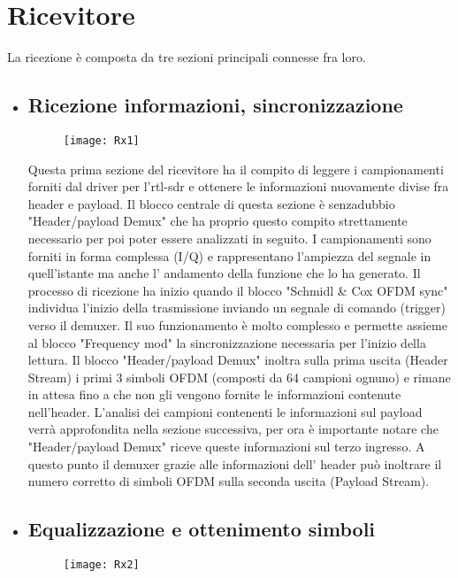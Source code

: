  \section{Ricevitore}
 La ricezione è composta da tre sezioni principali connesse fra loro.
 \begin{itemize}
 	\item \subsection{Ricezione informazioni, sincronizzazione}
 	\begin{figure}[h]
 		\centering
 		\texttt{[image: Rx1]}
 		\caption{}
 	\end{figure}
 Questa prima sezione del ricevitore ha il compito di leggere i campionamenti forniti dal driver per l'rtl-sdr e ottenere le informazioni nuovamente divise fra header e payload. Il blocco centrale di questa sezione è senzadubbio "Header/payload Demux" che ha proprio questo compito strettamente necessario per poi poter essere analizzati in seguito. I campionamenti sono forniti in forma complessa (I/Q) e rappresentano l'ampiezza del segnale in quell'istante ma anche l' andamento della funzione che lo ha generato. Il processo di ricezione ha inizio quando il blocco "Schmidl \& Cox OFDM sync" individua l'inizio della trasmissione inviando un segnale di comando (trigger) verso il demuxer. Il suo funzionamento è molto complesso e permette assieme al blocco "Frequency mod" la sincronizzazione necessaria per l'inizio della lettura. Il blocco "Header/payload Demux" inoltra sulla prima uscita (Header Stream) i primi 3 simboli OFDM (composti da 64 campioni ognuno) e rimane in attesa fino a che non gli vengono fornite le informazioni contenute nell'header. L'analisi dei campioni contenenti le informazioni sul payload verrà approfondita nella sezione successiva, per ora è importante notare che "Header/payload Demux" riceve queste informazioni sul terzo ingresso. A questo punto il demuxer grazie alle informazioni dell' header può inoltrare il numero corretto di simboli OFDM sulla seconda uscita (Payload Stream).
 	\item \subsection{Equalizzazione e ottenimento simboli}
 	\begin{figure}[h]
 		\centering
 		\texttt{[image: Rx2]}
 		\caption{}
 	\end{figure}

\end{itemize}
